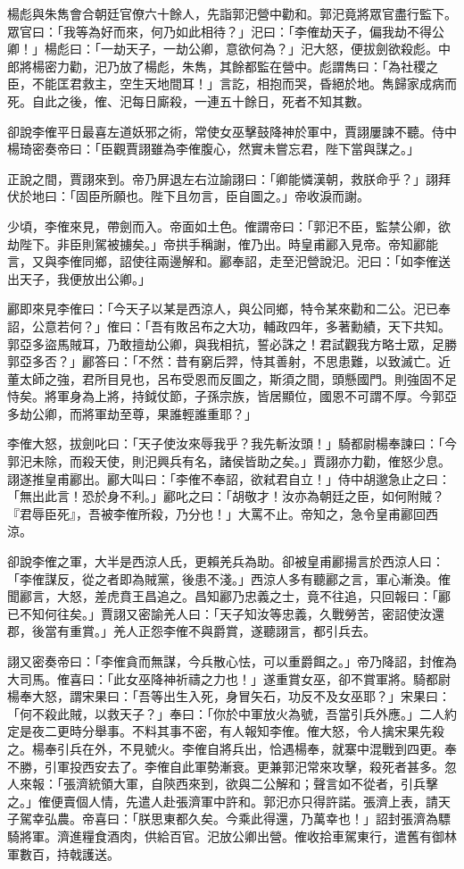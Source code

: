 楊彪與朱雋會合朝廷官僚六十餘人，先詣郭汜營中勸和。郭汜竟將眾官盡行監下。眾官曰：「我等為好而來，何乃如此相待？」汜曰：「李傕劫天子，偏我劫不得公卿！」楊彪曰：「一劫天子，一劫公卿，意欲何為？」汜大怒，便拔劍欲殺彪。中郎將楊密力勸，汜乃放了楊彪，朱雋，其餘都監在營中。彪謂雋曰：「為社稷之臣，不能匡君救主，空生天地間耳！」言訖，相抱而哭，昏絕於地。雋歸家成病而死。自此之後，傕、汜每日廝殺，一連五十餘日，死者不知其數。

卻說李傕平日最喜左道妖邪之術，常使女巫擊鼓降神於軍中，賈詡屢諫不聽。侍中楊琦密奏帝曰：「臣觀賈詡雖為李傕腹心，然實未嘗忘君，陛下當與謀之。」

正說之間，賈詡來到。帝乃屏退左右泣諭詡曰：「卿能憐漢朝，救朕命乎？」詡拜伏於地曰：「固臣所願也。陛下且勿言，臣自圖之。」帝收淚而謝。

少頃，李傕來見，帶劍而入。帝面如土色。傕謂帝曰：「郭汜不臣，監禁公卿，欲劫陛下。非臣則駕被擄矣。」帝拱手稱謝，傕乃出。時皇甫酈入見帝。帝知酈能言，又與李傕同鄉，詔使往兩邊解和。酈奉詔，走至汜營說汜。汜曰：「如李傕送出天子，我便放出公卿。」

酈即來見李傕曰：「今天子以某是西涼人，與公同鄉，特令某來勸和二公。汜已奉詔，公意若何？」傕曰：「吾有敗呂布之大功，輔政四年，多著勳績，天下共知。郭亞多盜馬賊耳，乃敢擅劫公卿，與我相抗，誓必誅之！君試觀我方略士眾，足勝郭亞多否？」酈答曰：「不然：昔有窮后羿，恃其善射，不思患難，以致滅亡。近董太師之強，君所目見也，呂布受恩而反圖之，斯須之間，頭懸國門。則強固不足恃矣。將軍身為上將，持鉞仗節，子孫宗族，皆居顯位，國恩不可謂不厚。今郭亞多劫公卿，而將軍劫至尊，果誰輕誰重耶？」

李傕大怒，拔劍叱曰：「天子使汝來辱我乎？我先斬汝頭！」騎都尉楊奉諫曰：「今郭汜未除，而殺天使，則汜興兵有名，諸侯皆助之矣。」賈詡亦力勸，傕怒少息。詡遂推皇甫酈出。酈大叫曰：「李傕不奉詔，欲弒君自立！」侍中胡邈急止之曰：「無出此言！恐於身不利。」酈叱之曰：「胡敬才！汝亦為朝廷之臣，如何附賊？『君辱臣死』，吾被李傕所殺，乃分也！」大罵不止。帝知之，急令皇甫酈回西涼。

卻說李傕之軍，大半是西涼人氏，更賴羌兵為助。卻被皇甫酈揚言於西涼人曰：「李傕謀反，從之者即為賊黨，後患不淺。」西涼人多有聽酈之言，軍心漸渙。傕聞酈言，大怒，差虎賁王昌追之。昌知酈乃忠義之士，竟不往追，只回報曰：「酈已不知何往矣。」賈詡又密諭羌人曰：「天子知汝等忠義，久戰勞苦，密詔使汝還郡，後當有重賞。」羌人正怨李傕不與爵賞，遂聽詡言，都引兵去。

詡又密奏帝曰：「李傕貪而無謀，今兵散心怯，可以重爵餌之。」帝乃降詔，封傕為大司馬。傕喜曰：「此女巫降神祈禱之力也！」遂重賞女巫，卻不賞軍將。騎都尉楊奉大怒，謂宋果曰：「吾等出生入死，身冒矢石，功反不及女巫耶？」宋果曰：「何不殺此賊，以救天子？」奉曰：「你於中軍放火為號，吾當引兵外應。」二人約定是夜二更時分舉事。不料其事不密，有人報知李傕。傕大怒，令人擒宋果先殺之。楊奉引兵在外，不見號火。李傕自將兵出，恰遇楊奉，就寨中混戰到四更。奉不勝，引軍投西安去了。李傕自此軍勢漸衰。更兼郭汜常來攻擊，殺死者甚多。忽人來報：「張濟統領大軍，自陝西來到，欲與二公解和；聲言如不從者，引兵擊之。」傕便賣個人情，先遣人赴張濟軍中許和。郭汜亦只得許諾。張濟上表，請天子駕幸弘農。帝喜曰：「朕思東都久矣。今乘此得還，乃萬幸也！」詔封張濟為驃騎將軍。濟進糧食酒肉，供給百官。汜放公卿出營。傕收拾車駕東行，遣舊有御林軍數百，持戟護送。

